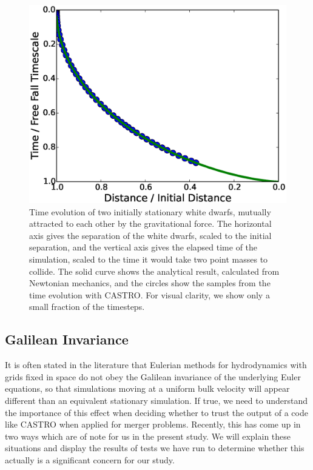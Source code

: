 \documentclass[iop]{emulateapj}
\begin{document}
\begin{figure}
  \centering
  \includegraphics[scale=0.45]{plots/freefall}
  \caption{Time evolution of two initially stationary white dwarfs,
    mutually attracted to each other by the gravitational force. The
    horizontal axis gives the separation of the white dwarfs, scaled
    to the initial separation, and the vertical axis gives the elapsed
    time of the simulation, scaled to the time it would take two point masses
    to collide. The solid curve shows the analytical result,
    calculated from Newtonian mechanics, and the circles show the
    samples from the time evolution with CASTRO. For visual clarity, we 
    show only a small fraction of the timesteps.}
  \label{Fig:Free Fall}
\end{figure}

\subsection{Galilean Invariance}\label{sec:galileo}

It is often stated in the literature that Eulerian methods for
hydrodynamics with grids fixed in space do not obey the Galilean
invariance of the underlying Euler equations, so that simulations
moving at a uniform bulk velocity will appear different than an
equivalent stationary simulation. If true, we need to understand 
the importance of this effect when deciding whether to trust the 
output of a code like CASTRO when applied for merger problems.
Recently, this has come up in two ways which are of note for us 
in the present study. We will explain these situations and display 
the results of tests we have run to determine whether this 
actually is a significant concern for our study.
\end{document}
